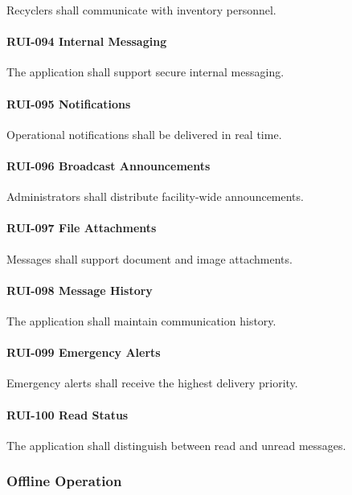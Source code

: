 Recyclers shall communicate with inventory personnel.

\paragraph{RUI-094 Internal Messaging}

The application shall support secure internal messaging.

\paragraph{RUI-095 Notifications}

Operational notifications shall be delivered in real time.

\paragraph{RUI-096 Broadcast Announcements}

Administrators shall distribute facility-wide announcements.

\paragraph{RUI-097 File Attachments}

Messages shall support document and image attachments.

\paragraph{RUI-098 Message History}

The application shall maintain communication history.

\paragraph{RUI-099 Emergency Alerts}

Emergency alerts shall receive the highest delivery priority.

\paragraph{RUI-100 Read Status}

The application shall distinguish between read and unread messages.


\subsubsection*{Offline Operation}

